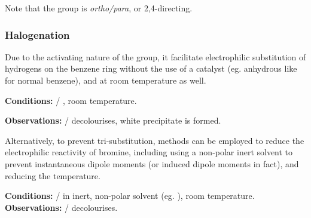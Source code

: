 			Note that the  group is \textit{ortho/para}, or 2,4-directing.

			\pagebreak
			\subsubsection{Halogenation}

				Due to the activating nature of the  group, it facilitate electrophilic substitution of hydrogens on the benzene ring
				without the use of a catalyst (eg. anhydrous  like for normal benzene), and at room temperature as well.


				\vspace{1.5em}
				\vbox{\textbf{Conditions:}	\tabto{35mm} / \ch{\Cl 2 \stAq}, room temperature.}

				\vspace{0.75em}
				\vbox{\textbf{Observations:}\tabto{35mm}  /   decolourises,			\tabto{35mm}white precipitate is formed.}



				Alternatively, to prevent tri-substitution, methods can be employed to reduce the electrophilic reactivity of bromine, including
				using a non-polar inert solvent to prevent instantaneous dipole moments (or induced dipole moments in fact), and reducing
				the temperature.



				\vspace{1.5em}
				\vbox{\textbf{Conditions:}	\tabto{35mm} / \ch{\Cl 2 \stG} in inert, non-polar solvent (eg. ), room temperature.}
				\vbox{\textbf{Observations:}\tabto{35mm}  /   decolourises.}




